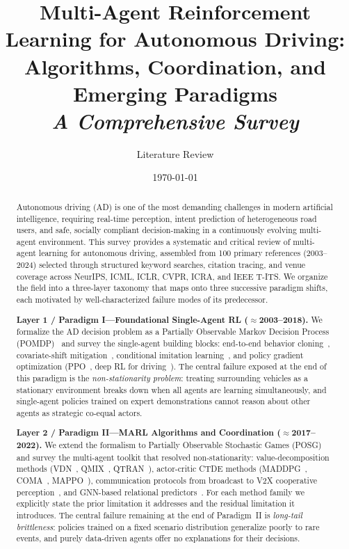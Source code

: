\documentclass[12pt, a4paper]{article}
\title{\textbf{Multi-Agent Reinforcement Learning for Autonomous Driving:\\
Algorithms, Coordination, and Emerging Paradigms}\\[0.4em]
{\large \textit{A Comprehensive Survey}}}
\author{\large Literature Review}
\date{\today}
\begin{document}
\maketitle

\begin{abstract}
Autonomous driving (AD) is one of the most demanding challenges in modern
artificial intelligence, requiring real-time perception, intent prediction of
heterogeneous road users, and safe, socially compliant decision-making in a
continuously evolving multi-agent environment.
This survey provides a systematic and critical review of multi-agent learning
for autonomous driving, assembled from 100 primary references (2003--2024)
selected through structured keyword searches, citation tracing, and venue
coverage across NeurIPS, ICML, ICLR, CVPR, ICRA, and IEEE T-ITS.
We organize the field into a three-layer taxonomy that maps onto three
successive paradigm shifts, each motivated by well-characterized failure
modes of its predecessor.

\textbf{Layer 1 / Paradigm I---Foundational Single-Agent RL ($\approx$2003--2018).}
We formalize the AD decision problem as a Partially Observable
Markov Decision Process (POMDP)~\cite{hubmann2018automated} and survey the
single-agent building blocks: end-to-end behavior
cloning~\cite{bojarski2016end}, covariate-shift
mitigation~\cite{bansal2018chauffeur}, conditional imitation
learning~\cite{codevilla2018end}, and policy gradient optimization
(PPO~\cite{schulman2017proximal}, deep RL for driving~\cite{sallab2017deep,kiran2021deep}).
The central failure exposed at the end of this paradigm is the
\emph{non-stationarity problem}: treating surrounding vehicles as a
stationary environment breaks down when all agents are learning
simultaneously, and single-agent policies trained on expert demonstrations
cannot reason about other agents as strategic co-equal actors.

\textbf{Layer 2 / Paradigm II---MARL Algorithms and Coordination ($\approx$2017--2022).}
We extend the formalism to Partially Observable Stochastic Games
(POSG)~\cite{littman1994markov,bernstein2002complexity} and survey the
multi-agent toolkit that resolved non-stationarity: value-decomposition
methods (VDN~\cite{sunehag2018value}, QMIX~\cite{rashid2018qmix},
QTRAN~\cite{son2019qtran}), actor-critic CTDE methods
(MADDPG~\cite{lowe2017multi}, COMA~\cite{foerster2018counterfactual},
MAPPO~\cite{yu2021surprising}), communication protocols from broadcast
to V2X cooperative perception~\cite{wang2020v2vnet}, and GNN-based
relational predictors~\cite{gao2020vectornet,salzmann2020trajectron,song2020pip}.
For each method family we explicitly state the prior limitation it addresses
and the residual limitation it introduces.  The central failure remaining
at the end of Paradigm~II is \emph{long-tail brittleness}: policies
trained on a fixed scenario distribution generalize poorly to rare events,
and purely data-driven agents offer no explanations for their decisions.


\end{abstract}
\end{document}
